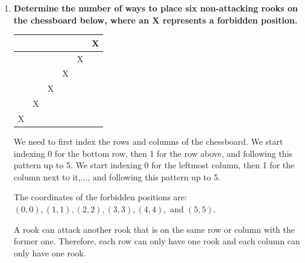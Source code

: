 \documentclass[10pt]{article}
\begin{document}
\begin{enumerate}
To find the number of ways 10 Oles randomly picked up the backpacks so that there are only two students who get their own backpacks, we will need to choose two lucky Oles from these students. There are $\binom{10}{2} = 45$ ways to do this. Then for each pair of students that pick up the backpacks correctly, the number of ways the other 8 unlucky Oles randomly picked up the backpacks and no one gets their own backpack is the derangement with all numbers $i \in \{1, ..., 8 \}$ does not end up in the $i^{th}$ position: $D_{8} = 8! \times \sum \limits_{k=0}^{8}\frac{(-1)^k}{k!} = 14833$. Therefore, the number of ways 10 Oles randomly picked up the backpacks so that only two students get their own backpacks is $14833 \times 45 = 667485$.

Therefore, the number of ways 10 Oles randomly picked up the backpacks so that at least three students get their own backpacks: $10! - D_{10} - \binom{10}{1} \times D_9 - \binom{10}{2} \times D_8 = 291394$.

 pt

\item
\textbf{Determine the number of ways to place six non-attacking rooks on the chessboard below, where an X represents a forbidden position.}
\begin{center}
\begin{tabular}{|c|c|c|c|c|c|}
\hline
&&&&&X\\
\hline
&&&&X&\\
\hline
&&&X&&\\
\hline
&&X&&&\\
\hline
&X&&&&\\
\hline
X&&&&&\\
\hline
\end{tabular}
\end{center}

We need to first index the rows and columns of the chessboard. We start indexing 0 for the bottom row, then 1 for the row above, and following this pattern up to 5. We start indexing 0 for the leftmost column, then 1 for the column next to it,..., and following this pattern up to 5.

The coordinates of the forbidden positions are: $(0,0), (1,1), (2,2), (3,3), (4,4),$ and $(5,5)$.

A rook can attack another rook that is on the same row or column with the former one. Therefore, each row can only have one rook and each column can only have one rook. 


\end{enumerate}
\end{document}

